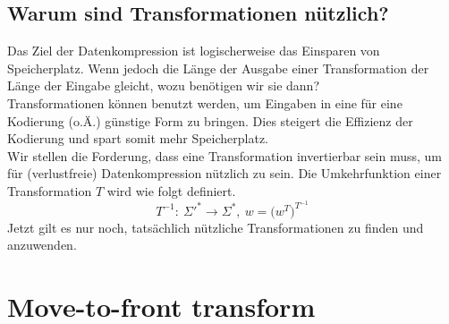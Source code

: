 \documentclass{article}
\begin{document}
\subsection{Warum sind Transformationen nützlich?}
Das Ziel der Datenkompression ist logischerweise das Einsparen von Speicherplatz.
Wenn jedoch die Länge der Ausgabe einer Transformation der Länge der Eingabe gleicht, wozu benötigen wir sie dann?
\\[.5cm]
Transformationen können benutzt werden, um Eingaben in eine für eine Kodierung (o.Ä.) günstige Form zu bringen. Dies steigert die Effizienz der Kodierung und spart somit mehr Speicherplatz.
\\[.5cm]
Wir stellen die Forderung, dass eine Transformation invertierbar sein muss, um für (verlustfreie) Datenkompression nützlich zu sein. Die Umkehrfunktion einer Transformation $T$ wird wie folgt definiert.
\[T^{-1}:~\Sigma'^*\rightarrow\Sigma^*,~w=\bigl(w^T\bigr)^{T^{-1}}\]
Jetzt gilt es nur noch, tatsächlich nützliche Transformationen zu finden und anzuwenden.


\section{Move-to-front transform}
\end{document}
